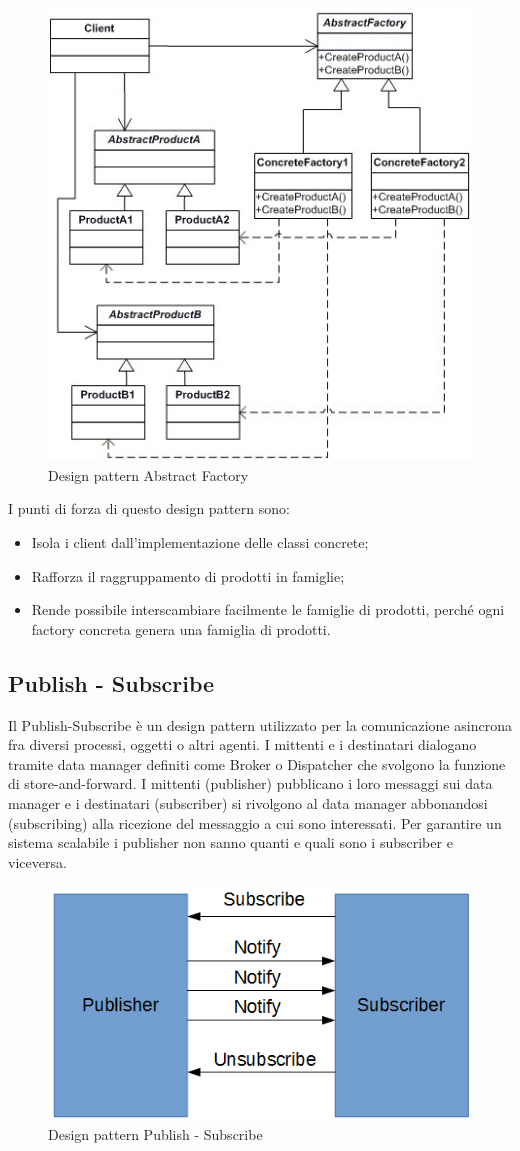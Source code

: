 \begin{figure}[h]
	\centering
	\includegraphics[width=0.8\linewidth]{IMG/abstract-pattern}
	\caption{Design pattern Abstract Factory}
	\label{fig:abstract-pattern}
\end{figure}


I punti di forza di questo design pattern sono:
\begin{itemize}
	\item Isola i client dall’implementazione delle classi concrete;
	\item Rafforza il raggruppamento di prodotti in famiglie;
	\item Rende possibile interscambiare facilmente le famiglie di prodotti, perché ogni factory concreta genera una famiglia di prodotti.
\end{itemize}

\subsection{Publish - Subscribe}
Il Publish-Subscribe è un design pattern utilizzato per la comunicazione asincrona fra diversi processi, oggetti o altri agenti. I mittenti e i destinatari dialogano tramite data manager definiti come Broker o Dispatcher che svolgono la funzione di store-and-forward.
I mittenti (publisher) pubblicano i loro messaggi sui data manager e i destinatari (subscriber) si rivolgono al data manager abbonandosi (subscribing) alla ricezione del messaggio a cui sono interessati. Per garantire un sistema scalabile i publisher non sanno quanti e quali sono i subscriber e viceversa.
\begin{figure}[h]
	\centering
	\includegraphics[width=0.5\linewidth]{IMG/pubsub}
	\caption{Design pattern Publish - Subscribe}
\end{figure}

